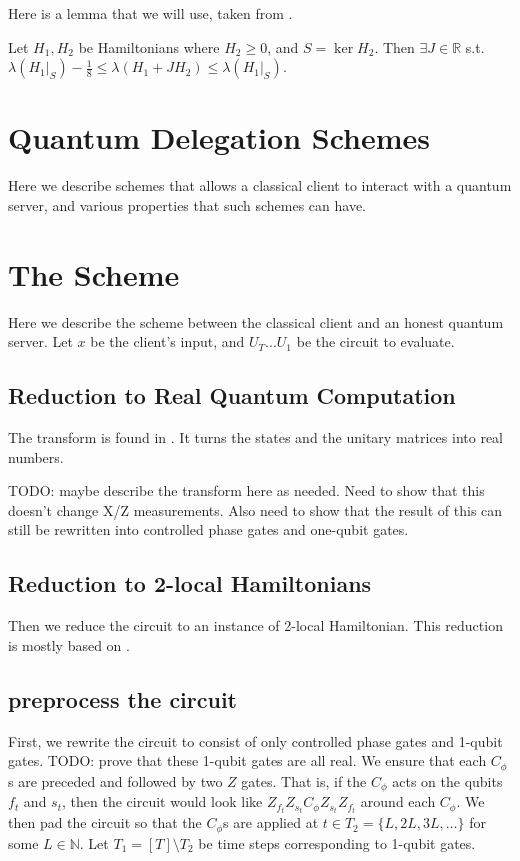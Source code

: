 \documentclass{article}
\theoremstyle{definition}
\begin{document}
Here is a lemma that we will use, taken from \cite{quant-ph/0406180}.

Let $H_1, H_2$ be Hamiltonians where $H_2\geq0$, and $S=\ker H_2$.
Then $\exists J\in\mathbb{R}$ s.t.
$\lambda(H_1\big|_S)-\frac{1}{8}\leq
	\lambda(H_1+JH_2)\leq\lambda(H_1\big|_S)$.

\section{Quantum Delegation Schemes}

Here we describe schemes that allows a classical client to interact with a quantum server, and various properties that such schemes can have.

\section{The Scheme}

Here we describe the scheme between the classical client and an honest quantum server.
Let $x$ be the client's input, and $U_T...U_1$ be the circuit to evaluate.

\subsection{Reduction to Real Quantum Computation}

The transform is found in \cite{1109.0795}. It turns the states and the unitary matrices into real numbers.

TODO: maybe describe the transform here as needed. Need to show that this doesn't change X/Z measurements. Also need to show that the result of this can still be rewritten into controlled phase gates and one-qubit gates.

\subsection{Reduction to 2-local Hamiltonians}

Then we reduce the circuit to an instance of 2-local Hamiltonian. This reduction is mostly based on \cite{quant-ph/0406180}.

\subsection{preprocess the circuit}

First, we rewrite the circuit to consist of only controlled phase gates and 1-qubit gates. TODO: prove that these 1-qubit gates are all real. We ensure that each $C_\phi$s are preceded and followed by two $Z$ gates. That is, if the $C_\phi$ acts on the qubits $f_t$ and $s_t$, then the circuit would look like $Z_{f_t}Z_{s_t}C_\phi Z_{s_t}Z_{f_t}$ around each $C_\phi$. We then pad the circuit so that the $C_\phi$s are applied at $t\in T_2=\{L, 2L, 3L, \ldots\}$ for some $L\in\mathbb{N}$. Let $T_1=[T]\setminus T_2$ be time steps corresponding to 1-qubit gates.
\end{document}
